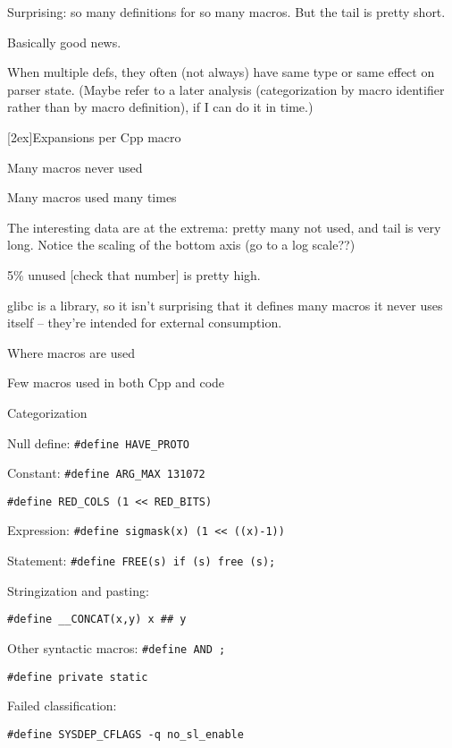 \documentclass{slides}
\def\slidetitle#1{\begin{center}\large #1 \end{center}}
\def\raisedslidetitle#1{\centerline{\raisebox{1.5in}[2ex]{\large #1}}}
\def\slbreak{\\ \strut\hspace{1em}}
\begin{document}
\begin{note}
Surprising: so many definitions for so many macros.  But the tail is pretty
short.

Basically good news.

When multiple defs, they often (not always) have same type or same effect
on parser state.  (Maybe refer to a later analysis (categorization by macro
identifier rather than by macro definition), if I can do it in time.)
\end{note}

\begin{slide}
\raisedslidetitle{Expansions per Cpp macro}

\centerline{}

Many macros never used \slbreak
Many macros used many times
\end{slide}

\begin{note}
The interesting data are at the extrema:  pretty many not used, and tail is
very long.  Notice the scaling of the bottom axis (go to a log scale??)

5\% unused [check that number] is pretty high.

glibc is a library, so it isn't surprising that it defines many macros it
never uses itself -- they're intended for external consumption.
\end{note}

\begin{slide}
\slidetitle{Where macros are used}

\centerline{}

Few macros used in both Cpp and code
\end{slide}

\begin{note}
\end{note}

\begin{slide}
\slidetitle{Categorization}

Null define: {\tt \#define \verb|HAVE_PROTO|}

Constant: {\tt \#define \verb|ARG_MAX| 131072} \slbreak
{\tt \#define \verb|RED_COLS| (1 << \verb|RED_BITS|)}

Expression: {\tt \#define sigmask(x) (1 << ((x)-1))}

Statement: {\tt \#define FREE(s) if (s) free (s);}

Stringization and pasting: \slbreak
  {\tt \#define \verb|__CONCAT|(x,y) x \#\# y}

Other syntactic macros: {\tt \#define AND ;} \slbreak
  {\tt \#define private static}

Failed classification: \slbreak
  {\tt \#define \verb|SYSDEP_CFLAGS| -q \verb|no_sl_enable|}
\end{slide}
\end{document}
